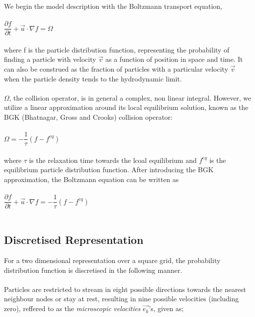 \documentclass[12pt,a4paper]{report}
\begin{document}
	We begin the model description with the Boltzmann transport equation,\\
	\\
	$
	\dfrac{\partial f}{\partial t} +\vec{u}\cdot \nabla f = \Omega
	$\\
	\\
	where f is the particle distribution function, representing 
	the probability of finding a particle with velocity $\vec{v}$ as a function of position in space and time. It
	can also be construed as the fraction of particles with a particular velocity $\vec{v}$ when the particle density tends to the hydrodynamic limit.\\
	\\
	$\Omega$, the collision operator, is in general a complex, non linear
	integral. However, we utilize a linear approximation around its local equilibrium solution, known as the BGK (Bhatnagar, 
	Gross and Crooks\cite{BGK}) collision operator:\\ 
	\\
	$
		\Omega = -\dfrac{1}{\tau}\left(f - f^{eq}\right)
	$\\
	\\
	where $\tau$ is the relaxation time towards the lcoal equilibrium and	$f^{eq}$ is the equilibrium particle distribution function. After introducing the BGK approximation, the Boltzmann equation can be written as\\
	\\
	$
		\dfrac{\partial f}{\partial t} +\vec{u}\cdot \nabla f = -\dfrac{1}{\tau}\left(f - f^{eq}\right)
	$\\
	\\
			
	\subsection{Discretised Representation}
	For a two dimensional representation over a square grid, 
	the probability distribution function is discretised in the 
	following manner.\\ 
	\\
	Particles are restricted to stream in eight possible
	directions towards the nearest neighbour nodes or stay 
	at rest, resulting in nine possible velocities (including zero), 
	reffered to as the \textit{microscopic velocities} $\vec{e_k}$'s,
	given as;\\   
	
\end{document}

